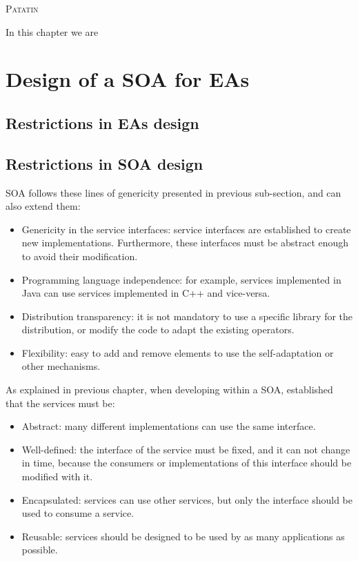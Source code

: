 \label{chap:soaea}
\minitoc\mtcskip
\vfill
\lettrine{P}{atatin}

In this chapter we are 

\section{Design of a SOA for EAs}

\subsection{Restrictions in EAs design}


\subsection{Restrictions in SOA design}

SOA follows these lines of genericity presented in previous sub-section, and can also extend them:
\begin{itemize}
\item Genericity in the service interfaces: service interfaces are established to create new implementations. Furthermore, these interfaces must be abstract enough to avoid their modification.
\item Programming language independence: for example, services implemented in Java can use services implemented in C++ and vice-versa.
\item Distribution transparency: it is not mandatory to use a specific library for the distribution, or modify the code to adapt the existing operators.
\item Flexibility: easy to add and remove elements to use the self-adaptation or other mechanisms.
\end{itemize}

As explained in previous chapter, when developing within a SOA, \cite{PAPAZOGLOU} established that the services must be: 
\begin{itemize}
\item Abstract: many different implementations can use the same interface.
\item Well-defined: the interface of the service must be fixed, and it can not change in time, because the consumers or implementations of this interface should be modified with it.
\item Encapsulated: services can use other services, but only the interface should be used to consume a service.
\item Reusable: services should be designed to be used by as many applications as possible. 
\end{itemize}


